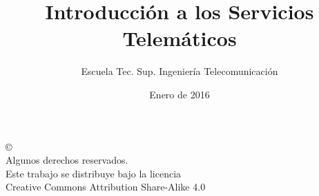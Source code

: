 \documentclass[ucs]{beamer}
\begin{document}
\title[Introducción a los Servicios Telemáticos]{Introducción a los Servicios Telemáticos }
\author[GSyC]{Escuela Tec. Sup. Ingeniería Telecomunicación}
\date[2016]{Enero de 2016}


\begin{frame}
  \titlepage
\end{frame}



\begin{frame}[b]
\begin{flushright}
{\tiny
\copyright \insertshortdate~\insertshortauthor \\
  Algunos derechos reservados. \\
  Este trabajo se distribuye bajo la licencia \\
  Creative Commons Attribution Share-Alike 4.0\\
}
\end{flushright}  
\end{frame}







\end{document}
